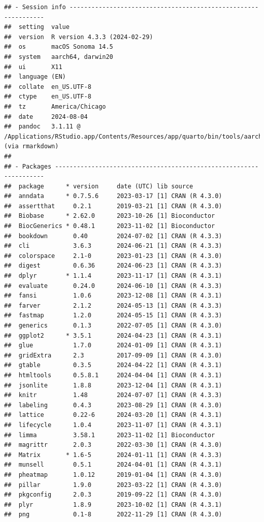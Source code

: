 \documentclass[
  12pt,
]{book}
\begin{document}
\begin{verbatim}
## - Session info ---------------------------------------------------------------
##  setting  value
##  version  R version 4.3.3 (2024-02-29)
##  os       macOS Sonoma 14.5
##  system   aarch64, darwin20
##  ui       X11
##  language (EN)
##  collate  en_US.UTF-8
##  ctype    en_US.UTF-8
##  tz       America/Chicago
##  date     2024-08-04
##  pandoc   3.1.11 @ /Applications/RStudio.app/Contents/Resources/app/quarto/bin/tools/aarch64/ (via rmarkdown)
## 
## - Packages -------------------------------------------------------------------
##  package      * version     date (UTC) lib source
##  anndata      * 0.7.5.6     2023-03-17 [1] CRAN (R 4.3.0)
##  assertthat     0.2.1       2019-03-21 [1] CRAN (R 4.3.0)
##  Biobase      * 2.62.0      2023-10-26 [1] Bioconductor
##  BiocGenerics * 0.48.1      2023-11-02 [1] Bioconductor
##  bookdown       0.40        2024-07-02 [1] CRAN (R 4.3.3)
##  cli            3.6.3       2024-06-21 [1] CRAN (R 4.3.3)
##  colorspace     2.1-0       2023-01-23 [1] CRAN (R 4.3.0)
##  digest         0.6.36      2024-06-23 [1] CRAN (R 4.3.3)
##  dplyr        * 1.1.4       2023-11-17 [1] CRAN (R 4.3.1)
##  evaluate       0.24.0      2024-06-10 [1] CRAN (R 4.3.3)
##  fansi          1.0.6       2023-12-08 [1] CRAN (R 4.3.1)
##  farver         2.1.2       2024-05-13 [1] CRAN (R 4.3.3)
##  fastmap        1.2.0       2024-05-15 [1] CRAN (R 4.3.3)
##  generics       0.1.3       2022-07-05 [1] CRAN (R 4.3.0)
##  ggplot2      * 3.5.1       2024-04-23 [1] CRAN (R 4.3.1)
##  glue           1.7.0       2024-01-09 [1] CRAN (R 4.3.1)
##  gridExtra      2.3         2017-09-09 [1] CRAN (R 4.3.0)
##  gtable         0.3.5       2024-04-22 [1] CRAN (R 4.3.1)
##  htmltools      0.5.8.1     2024-04-04 [1] CRAN (R 4.3.1)
##  jsonlite       1.8.8       2023-12-04 [1] CRAN (R 4.3.1)
##  knitr          1.48        2024-07-07 [1] CRAN (R 4.3.3)
##  labeling       0.4.3       2023-08-29 [1] CRAN (R 4.3.0)
##  lattice        0.22-6      2024-03-20 [1] CRAN (R 4.3.1)
##  lifecycle      1.0.4       2023-11-07 [1] CRAN (R 4.3.1)
##  limma          3.58.1      2023-11-02 [1] Bioconductor
##  magrittr       2.0.3       2022-03-30 [1] CRAN (R 4.3.0)
##  Matrix       * 1.6-5       2024-01-11 [1] CRAN (R 4.3.3)
##  munsell        0.5.1       2024-04-01 [1] CRAN (R 4.3.1)
##  pheatmap       1.0.12      2019-01-04 [1] CRAN (R 4.3.0)
##  pillar         1.9.0       2023-03-22 [1] CRAN (R 4.3.0)
##  pkgconfig      2.0.3       2019-09-22 [1] CRAN (R 4.3.0)
##  plyr           1.8.9       2023-10-02 [1] CRAN (R 4.3.1)
##  png            0.1-8       2022-11-29 [1] CRAN (R 4.3.0)

\end{verbatim}
\end{document}
